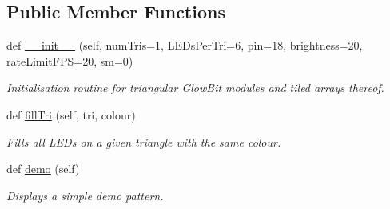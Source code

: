 \subsection*{Public Member Functions}
\begin{DoxyCompactItemize}
\item 
def \hyperlink{classglowbit_1_1triangle_aa9ff905dd6cde53bf8a39b3f8cb9482f}{\+\_\+\+\_\+init\+\_\+\+\_\+} (self, num\+Tris=1, L\+E\+Ds\+Per\+Tri=6, pin=18, brightness=20, rate\+Limit\+F\+PS=20, sm=0)
\begin{DoxyCompactList}\small\item\em Initialisation routine for triangular Glow\+Bit modules and tiled arrays thereof. \end{DoxyCompactList}\item 
def \hyperlink{classglowbit_1_1triangle_a26f35bf61d507d755ce039f4a0210c08}{fill\+Tri} (self, tri, colour)
\begin{DoxyCompactList}\small\item\em Fills all L\+E\+Ds on a given triangle with the same colour. \end{DoxyCompactList}\item 
\mbox{\label{classglowbit_1_1triangle_a92bbeb798c85640681325d3d9654fefc}} 
def \hyperlink{classglowbit_1_1triangle_a92bbeb798c85640681325d3d9654fefc}{demo} (self)
\begin{DoxyCompactList}\small\item\em Displays a simple demo pattern. \end{DoxyCompactList}\end{DoxyCompactItemize}
